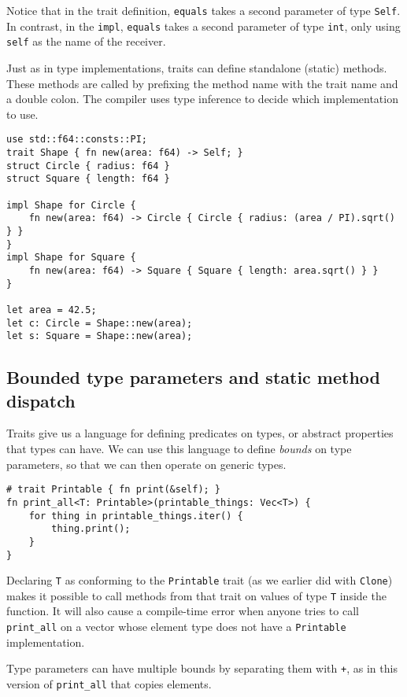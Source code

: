 \documentclass[]{article}
\begin{document}
Notice that in the trait definition, \texttt{equals} takes a second
parameter of type \texttt{Self}. In contrast, in the \texttt{impl},
\texttt{equals} takes a second parameter of type \texttt{int}, only
using \texttt{self} as the name of the receiver.

Just as in type implementations, traits can define standalone (static)
methods. These methods are called by prefixing the method name with the
trait name and a double colon. The compiler uses type inference to
decide which implementation to use.

\begin{verbatim}
use std::f64::consts::PI;
trait Shape { fn new(area: f64) -> Self; }
struct Circle { radius: f64 }
struct Square { length: f64 }

impl Shape for Circle {
    fn new(area: f64) -> Circle { Circle { radius: (area / PI).sqrt() } }
}
impl Shape for Square {
    fn new(area: f64) -> Square { Square { length: area.sqrt() } }
}

let area = 42.5;
let c: Circle = Shape::new(area);
let s: Square = Shape::new(area);
\end{verbatim}

\subsection{Bounded type parameters and static method
dispatch}\label{bounded-type-parameters-and-static-method-dispatch}

Traits give us a language for defining predicates on types, or abstract
properties that types can have. We can use this language to define
\emph{bounds} on type parameters, so that we can then operate on generic
types.

\begin{verbatim}
# trait Printable { fn print(&self); }
fn print_all<T: Printable>(printable_things: Vec<T>) {
    for thing in printable_things.iter() {
        thing.print();
    }
}
\end{verbatim}

Declaring \texttt{T} as conforming to the \texttt{Printable} trait (as
we earlier did with \texttt{Clone}) makes it possible to call methods
from that trait on values of type \texttt{T} inside the function. It
will also cause a compile-time error when anyone tries to call
\texttt{print\_all} on a vector whose element type does not have a
\texttt{Printable} implementation.

Type parameters can have multiple bounds by separating them with
\texttt{+}, as in this version of \texttt{print\_all} that copies
elements.
\end{document}
